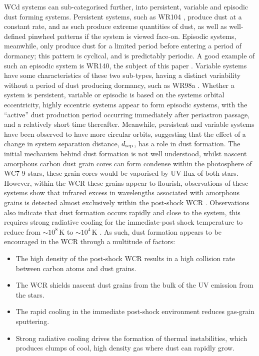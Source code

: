 WCd systems can sub-categorised further, into persistent, variable and episodic dust forming systems.
Persistent systems, such as WR104 \parencite{tuthill_dusty_1999}, produce dust at a constant rate, and as such produce extreme quantities of dust, as well as well-defined pinwheel patterns if the system is viewed face-on.
Episodic systems, meanwhile, only produce dust for a limited period before entering a period of dormancy; this pattern is cyclical, and is predictably periodic.
A good example of such an episodic system is WR140, the subject of this paper \parencite{williamsMultifrequencyVariationsWolfrayet1990}.
Variable systems have some characteristics of these two sub-types, having a distinct variability without a period of dust producing dormancy, such as WR98a \parencite{monnierPinwheelNebulaWR1999}.
Whether a system is persistent, variable or episodic is based on the systems orbital eccentricity, highly eccentric systems appear to form episodic systems, with the ``active'' dust production period occurring immediately after periastron passage, and a relatively short time thereafter.
Meanwhile, persistent and variable systems have been observed to have more circular orbits, suggesting that the effect of a change in system separation distance, $d_\text{sep}$, has a role in dust formation.
The initial mechanism behind dust formation is not well understood, whilst nascent amorphous carbon dust grain cores can form condense within the photosphere of WC7-9 stars,
these grain cores would be vaporised by UV flux of both stars.
However, within the WCR these grains appear to flourish, observations of these systems show that infrared excess in wavelengths associated with amorphous grains is detected almost exclusively within the post-shock WCR \parencite{soulainSPHEREViewWolfRayet2018}.
Observations also indicate that dust formation occurs rapidly and close to the system, this requires strong radiative cooling for the immediate-post shock temperature to reduce from $\sim 10^8 \, \si{\kelvin}$ to $\sim 10^4 \, \si{\kelvin}$
\parencite{williamsInfraredPhotometryLatetype1987,williamsMultifrequencyVariationsWolfrayet1990}.
As such, dust formation appears to be encouraged in the WCR through a multitude of factors:


\begin{itemize}
  \item The high density of the post-shock WCR results in a high collision rate between carbon atoms and dust grains.
  \item The WCR shields nascent dust grains from the bulk of the UV emission from the stars.
  \item The rapid cooling in the immediate post-shock environment reduces gas-grain sputtering.
  \item Strong radiative cooling drives the formation of thermal instabilities, which produces clumps of cool, high density gas where dust can rapidly grow.
\end{itemize}


